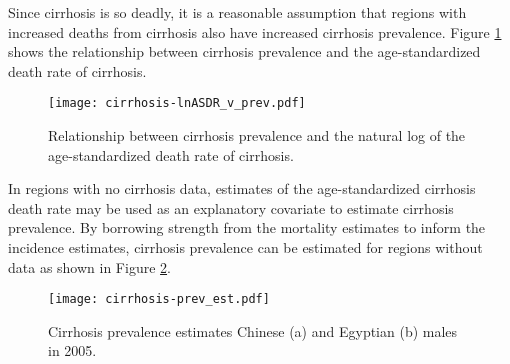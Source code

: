 Since cirrhosis is so deadly, it is a reasonable assumption that regions with increased deaths from cirrhosis also have increased cirrhosis prevalence.  Figure \ref{fig:app-cirrhosis asp} shows the relationship between cirrhosis prevalence and the age-standardized death rate of cirrhosis.

    \begin{figure}[h]
        \begin{center}
            \texttt{[image: cirrhosis-lnASDR\_v\_prev.pdf]}
            \caption{Relationship between cirrhosis prevalence and the natural log of the age-standardized death rate of cirrhosis.}
            \label{fig:app-cirrhosis asp}
        \end{center}
    \end{figure}

In regions with no cirrhosis data, estimates of the age-standardized cirrhosis death rate may be used as an explanatory covariate to estimate cirrhosis prevalence.  By borrowing strength from the mortality estimates to inform the incidence estimates, cirrhosis prevalence can be estimated for regions without data as shown in Figure \ref{fig:app-cirrhosis prev est}.

    \begin{figure}[h]
        \begin{center}
            \texttt{[image: cirrhosis-prev\_est.pdf]}
            \caption{Cirrhosis prevalence estimates Chinese (a) and Egyptian (b) males in 2005.}
            \label{fig:app-cirrhosis prev est}
        \end{center}
    \end{figure}
